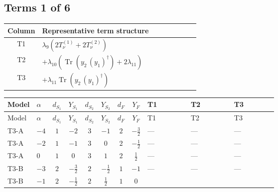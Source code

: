 \documentclass[8pt]{article}
\begin{document}
\begin{landscape}
\subsection*{Terms 1 of 6}
\begin{center}
\begin{tabular}{@{}c >{\raggedright\arraybackslash}p{0.82\linewidth}@{}}
\toprule
Column & Representative term structure \\
\midrule
T1 & \(\displaystyle {\lambda_{9}} (2 T_{\nu}^{(1)}+2 T_{\nu}^{(2)})\) \\
\midrule
T2 & \(\displaystyle +{\lambda_{10}} (\operatorname{Tr}\!\left({y_2}\,\left({y_1}\right)^{\dagger}\right)+2 {\lambda_{11}})\) \\
\midrule
T3 & \(\displaystyle +{\lambda_{11}} \operatorname{Tr}\!\left({y_2}\,\left({y_1}\right)^{\dagger}\right)\) \\
\midrule
\bottomrule
\end{tabular}
\end{center}
\smallskip
\tiny
\begin{longtable}{@{}llcccccc >{\raggedright\arraybackslash}p{0.21\linewidth} >{\raggedright\arraybackslash}p{0.21\linewidth} >{\raggedright\arraybackslash}p{0.21\linewidth}@{}}
\toprule
Model & $\alpha$ & $d_{S_1}$ & $Y_{S_1}$ & $d_{S_2}$ & $Y_{S_2}$ & $d_F$ & $Y_F$ & T1 & T2 & T3 \\
\midrule
\endfirsthead
\toprule
Model & $\alpha$ & $d_{S_1}$ & $Y_{S_1}$ & $d_{S_2}$ & $Y_{S_2}$ & $d_F$ & $Y_F$ & T1 & T2 & T3 \\
\midrule
\endhead
T3-A & $-4$ & $1$ & $-2$ & $3$ & $-1$ & $2$ & $-\frac{3}{2}$ & --- & --- & --- \\
\midrule
T3-A & $-2$ & $1$ & $-1$ & $3$ & $0$ & $2$ & $-\frac{1}{2}$ & --- & --- & --- \\
\midrule
T3-A & $0$ & $1$ & $0$ & $3$ & $1$ & $2$ & $\frac{1}{2}$ & --- & --- & --- \\
\midrule
T3-B & $-3$ & $2$ & $-\frac{3}{2}$ & $2$ & $-\frac{1}{2}$ & $1$ & $-1$ & --- & --- & --- \\
\midrule
T3-B & $-1$ & $2$ & $-\frac{1}{2}$ & $2$ & $\frac{1}{2}$ & $1$ & $0$ & \scriptsize\adjustbox{max width=\linewidth}{$\begin{gathered} {\lambda_{9}} (2 T_{\nu}^{(1)}+2 T_{\nu}^{(2)})\end{gathered}$} & \scriptsize\adjustbox{max width=\linewidth}{$\begin{gathered} +{\lambda_{10}} (\operatorname{Tr}\!\left({y_2}\,\left({y_1}\right)^{\dagger}\right)+2 {\lambda_{11}})\end{gathered}$} & \scriptsize\adjustbox{max width=\linewidth}{$\begin{gathered} +{\lambda_{11}} \operatorname{Tr}\!\left({y_2}\,\left({y_1}\right)^{\dagger}\right)\end{gathered}$} \\

\end{longtable}
\end{landscape}
\end{document}
